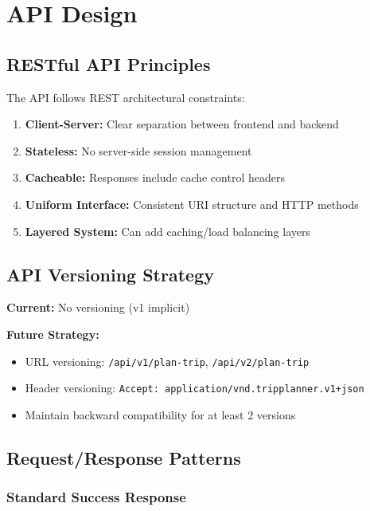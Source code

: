 \documentclass[12pt,a4paper]{report}
\begin{document}
\chapter{API Design}

\section{RESTful API Principles}

The API follows REST architectural constraints:

\begin{enumerate}
    \item \textbf{Client-Server:} Clear separation between frontend and backend
    \item \textbf{Stateless:} No server-side session management
    \item \textbf{Cacheable:} Responses include cache control headers
    \item \textbf{Uniform Interface:} Consistent URI structure and HTTP methods
    \item \textbf{Layered System:} Can add caching/load balancing layers
\end{enumerate}

\section{API Versioning Strategy}

\textbf{Current:} No versioning (v1 implicit)

\textbf{Future Strategy:}
\begin{itemize}
    \item URL versioning: \texttt{/api/v1/plan-trip}, \texttt{/api/v2/plan-trip}
    \item Header versioning: \texttt{Accept: application/vnd.tripplanner.v1+json}
    \item Maintain backward compatibility for at least 2 versions
\end{itemize}

\section{Request/Response Patterns}

\subsection{Standard Success Response}
\end{document}
